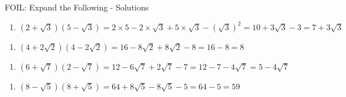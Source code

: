 \documentclass[aspectratio=169]{beamer}
\begin{document}
\begin{frame}{FOIL: Expand the Following - Solutions}
\begin{tcolorbox}[colback=lightgray,colframe=primary,title=Solutions]
\footnotesize
\begin{enumerate}[label=6\textbf{a})]
  \item $\left(2+\sqrt{3}\right)\left(5-\sqrt{3}\right) = 2\times5 - 2\times\sqrt{3} + 5\times\sqrt{3} - (\sqrt{3})^2 = 10 + 3\sqrt{3} - 3 = 7 + 3\sqrt{3}$
\end{enumerate}
\begin{enumerate}[label=6\textbf{b})]
  \item $\left(4+2\sqrt{2}\right)\left(4-2\sqrt{2}\right) = 16 - 8\sqrt{2} + 8\sqrt{2} - 8 = 16 - 8 = 8$
\end{enumerate}
\begin{enumerate}[label=6\textbf{c})]
  \item $\left(6+\sqrt{7}\right)\left(2-\sqrt{7}\right) = 12 - 6\sqrt{7} + 2\sqrt{7} - 7 = 12 - 7 - 4\sqrt{7} = 5 - 4\sqrt{7}$
\end{enumerate}
\begin{enumerate}[label=6\textbf{d})]
  \item $\left(8-\sqrt{5}\right)\left(8+\sqrt{5}\right) = 64 + 8\sqrt{5} - 8\sqrt{5} - 5 = 64 - 5 = 59$
\end{enumerate}
\end{tcolorbox}
\end{frame}
\end{document}
